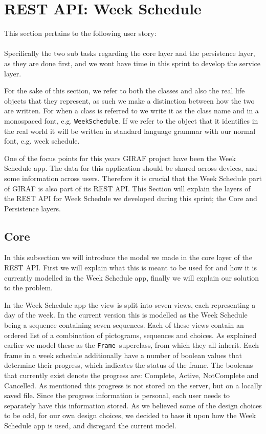 \section{REST API: Week Schedule}\label{sec:restws}
This section pertains to the following user story: \\
 \\
Specifically the two sub tasks regarding the core layer and the persistence layer, as they are done first, and we wont have time in this sprint to develop the service layer.

For the sake of this section, we refer to both the classes and also the real life objects that they represent, as such we make a distinction between how the two are written.
For when a class is referred to we write it as the class name and in a monospaced font, e.g. \texttt{WeekSchedule}.
If we refer to the object that it identifies in the real world it will be written in standard language grammar with our normal font, e.g. week schedule.

\noindent
One of the focus points for this years GIRAF project have been the Week Schedule app.
The data for this application should be shared across devices, and some information across users.
Therefore it is crucial that the Week Schedule part of GIRAF is also part of its REST API.
This Section will explain the layers of the REST API for Week Schedule we developed during this sprint; the Core and Persistence layers. 

\subsection{Core}
In this subsection we will introduce the model we made in the core layer of the REST API.
First we will explain what this is meant to be used for and how it is currently modelled in the Week Schedule app, finally we will explain our solution to the problem. 

In the Week Schedule app the view is split into seven views, each representing a day of the week.
In the current version this is modelled as the Week Schedule being a sequence containing seven sequences.
Each of these views contain an ordered list of a combination of pictograms, sequences and choices.
As explained earlier we model these as the \texttt{Frame}--superclass, from which they all inherit. %
Each frame in a week schedule additionally have a number of boolean values that determine their progress, which indicates the status of the frame. 
The booleans that currently exist denote the progress are: Complete, Active, NotComplete and Cancelled. 
As mentioned this progress is not stored on the server, but on a locally saved file.
Since the progress information is personal, each user needs to separately have this information stored. 
As we believed some of the design choices to be odd, for our own design choices, we decided to base it upon how the Week Schedule app is used, and disregard the current model.

